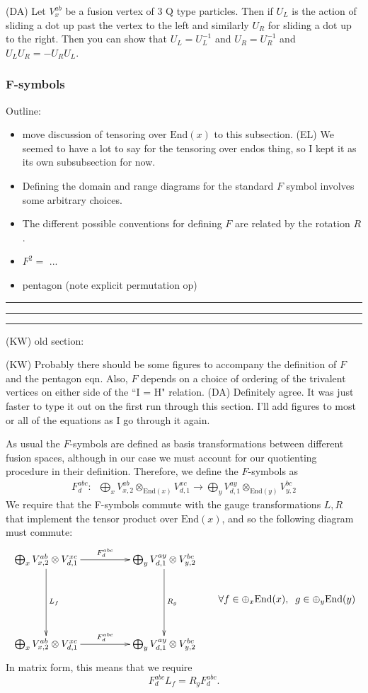 \documentclass[12pt,a4paper]{article}
\newcounter{arrow}
\newcommand{\tp}{\otimes}
\newcommand\be            {\begin{equation}}
\newcommand\ee            {\end{equation}}
\newcommand{\End}{\text{End}}
\newcommand{\dave}[1]{{\color{ao(english)}\footnotesize{(DA) #1}}}
\newcommand{\ethan}[1]{{\color{amethyst}\footnotesize{(EL) #1}}}
\newcommand{\kw}[1]{{\color{kwcolor}\footnotesize{(KW) #1}}}
\newcommand{\kwsep}{\bigskip\hrule\medskip\hrule\medskip\hrule\bigskip}
\begin{document}
\dave{Let $V^{ab}_x$ be a fusion vertex of $3$ Q type particles. Then if $U_L$ is the action of sliding a dot up past the vertex to the left and similarly $U_R$ for sliding a dot up to the right. Then you can show that $U_L = U_L^{-1}$ and $U_R = U_R^{-1}$ and $U_L U_R = - U_R U_L$.}


\subsubsection{F-symbols}

Outline:
\begin{itemize}
\item move discussion of tensoring over $\End(x)$ to this subsection. 
\ethan{We seemed to have a lot to say for the tensoring over endos thing, so I kept it as its own subsubsection for now.}
\item Defining the domain and range diagrams for the standard $F$ symbol involves some arbitrary choices.
\item The different possible conventions for defining $F$ are related by the rotation $R$.
\item $F^2 = $ ...
\item pentagon (note explicit permutation op)
\end{itemize}




\kwsep

\kw{old section:}



\kw{Probably there should be some figures to accompany the definition of $F$ and the pentagon eqn.
Also, $F$ depends on a choice of ordering of the trivalent vertices on either side of the ``I = H" relation.}
\dave{Definitely agree. It was just faster to type it out on the first run through this section. I'll add figures to most or all of the equations as I go through it again.}

As usual the $F$-symbols are defined as basis transformations between different fusion spaces, although in our case we must account for our quotienting procedure in their definition. Therefore, we define the $F$-symbols as
\begin{align}
F^{abc}_d: \; \; \bigoplus_x V^{ab}_{x,2} \tp_{\text{End}(x)} V^{xc}_{d,1} \rightarrow \bigoplus_y V^{ay}_{d,1} \tp_{\text{End}(y)} V^{bc}_{y,2}
\end{align}
We require that the F-symbols commute with the gauge transformations $L,R$ that implement the tensor product over $\End(x)$, and so the following diagram must commute:
\begin{align}
	\vcenter{\xymatrix @!0 @M=1mm @R=30mm @C=42mm{
		 \bigoplus_x V^{ab}_{x,2} \otimes V^{xc}_{d,1} \ar[d]^{L_{f}}\ar[r]^{F^{abc}_d}& \bigoplus_y V^{ay}_{d,1} \otimes V^{bc}_{y,2} \ar[d]^{R_{g}} \\
		\bigoplus_x V^{ab}_{x,2} \otimes V^{xc}_{d,1}  \ar[r]^{F^{abc}_d}  & \bigoplus_y V^{ay}_{d,1} \otimes V^{bc}_{y,2}	
	}} 
	{ \quad\quad \forall f \in \oplus_x \text{End}(x), \; \; g \in \oplus_y \text{End}(y)}
	\label{Fcommute}
\end{align}
In matrix form, this means that we require 
\be
F^{abc}_d  L_f=   R_g F^{abc}_d.
\ee
\end{document}

